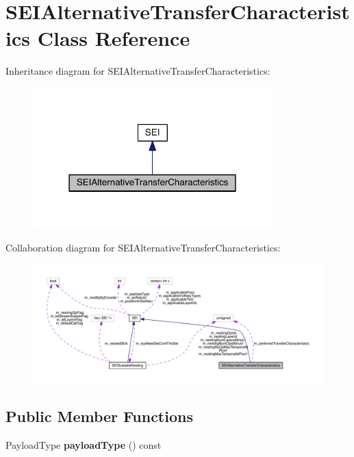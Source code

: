\hypertarget{class_s_e_i_alternative_transfer_characteristics}{}\section{S\+E\+I\+Alternative\+Transfer\+Characteristics Class Reference}
\label{class_s_e_i_alternative_transfer_characteristics}


Inheritance diagram for S\+E\+I\+Alternative\+Transfer\+Characteristics\+:
\nopagebreak
\begin{figure}[H]
\begin{center}
\leavevmode
\includegraphics[width=262pt]{d6/d34/class_s_e_i_alternative_transfer_characteristics__inherit__graph}
\end{center}
\end{figure}


Collaboration diagram for S\+E\+I\+Alternative\+Transfer\+Characteristics\+:
\nopagebreak
\begin{figure}[H]
\begin{center}
\leavevmode
\includegraphics[width=350pt]{df/d98/class_s_e_i_alternative_transfer_characteristics__coll__graph}
\end{center}
\end{figure}
\subsection*{Public Member Functions}
\begin{DoxyCompactItemize}
\item 
\mbox{\label{class_s_e_i_alternative_transfer_characteristics_a8c189f27cfd4bc92e9accf2a5726cfe2}} 
Payload\+Type {\bfseries payload\+Type} () const
\end{DoxyCompactItemize}

